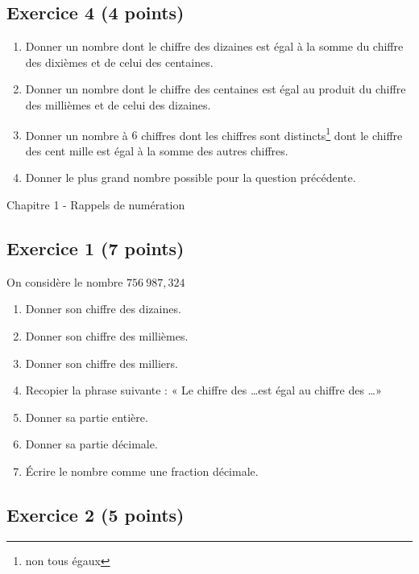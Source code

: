 \documentclass[12 pt]{extarticle}
\theoremstyle{plain}
\begin{document}
  \subsection*{Exercice 4 (4 points)}

\begin{enumerate}
\item Donner un nombre dont le chiffre des dizaines est égal à la somme du chiffre des dixièmes et de celui des centaines.

\item Donner un nombre dont le chiffre des centaines est égal au produit du chiffre des millièmes et de celui des dizaines.

\item Donner un nombre à $6$ chiffres dont les chiffres sont distincts\footnote{non tous égaux} dont le chiffre des cent mille est égal à la somme des autres chiffres.
\item Donner le plus grand nombre possible pour la question précédente. 

\end{enumerate}

\newpage


\begin{center}{\Large Chapitre 1 - Rappels de  numération}\\ 
 \end{center}
  
  \subsection*{Exercice 1 (7 points)}
  
  On considère le nombre $756\ 987, 324$
  
  \begin{enumerate}
  \item Donner son chiffre des dizaines. 
  \item Donner son chiffre des millièmes. 
  \item Donner son chiffre des milliers. 
  \item Recopier la phrase suivante : « Le chiffre des \ldots est égal au chiffre des \ldots »
  \item Donner sa partie entière. 
  \item Donner sa partie décimale. 
  \item Écrire le nombre comme une fraction décimale. 
  \end{enumerate}
  
  \subsection*{Exercice 2 (5 points)}
  
\end{document}
